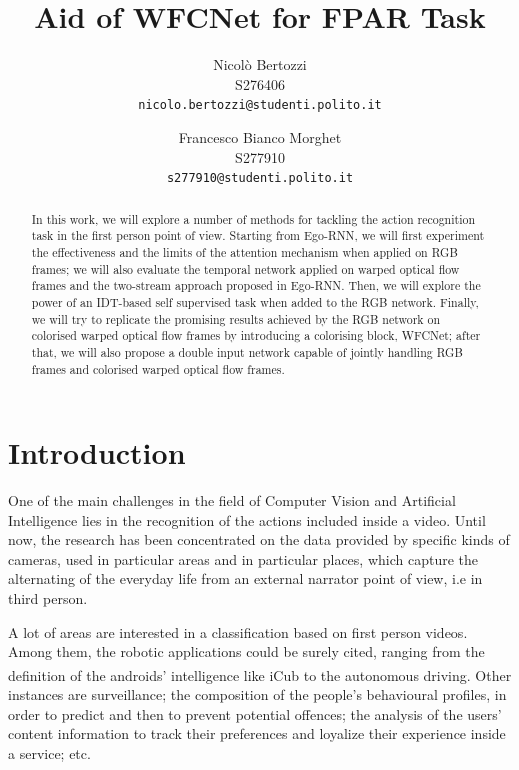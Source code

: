 \documentclass[10pt,twocolumn,letterpaper]{article}
\begin{document}
\title{Aid of WFCNet for FPAR Task}

\author{Nicolò Bertozzi\\
S276406\\
{\tt\small nicolo.bertozzi@studenti.polito.it}
\and
Francesco Bianco Morghet\\
S277910\\
{\tt\small s277910@studenti.polito.it}
}

\maketitle


\begin{abstract}
	In this work, we will explore a number of methods for tackling the action recognition task in the first person point of view. Starting from Ego-RNN, we will first experiment the effectiveness and the limits of the attention mechanism when applied on RGB frames; we will also evaluate the temporal network applied on warped optical flow frames and the two-stream approach proposed in Ego-RNN. Then, we will explore the power of an IDT-based self supervised task when added to the RGB network. Finally, we will try to replicate the promising results achieved by the RGB network on colorised warped optical flow frames by introducing a colorising block, WFCNet; after that, we will also propose a double input network capable of jointly handling RGB frames and colorised warped optical flow frames.
\end{abstract}


\section{Introduction}

One of the main challenges in the field of Computer Vision and Artificial Intelligence lies in the recognition of the actions included inside a video. Until now, the research has been concentrated on the data provided by specific kinds of cameras, used in particular areas and in particular places, which capture the alternating of the everyday life from an external narrator point of view, i.e in third person.

A lot of areas are interested in a classification based on first person videos. Among them, the robotic applications could be surely cited, ranging from the definition of the androids’ intelligence like iCub\textsuperscript{\textcopyright} to the autonomous driving. Other instances are surveillance; the composition of the people’s behavioural profiles, in order to predict and then to prevent potential offences; the analysis of the users’ content information to track their preferences and loyalize their experience inside a service; etc.
\end{document}
